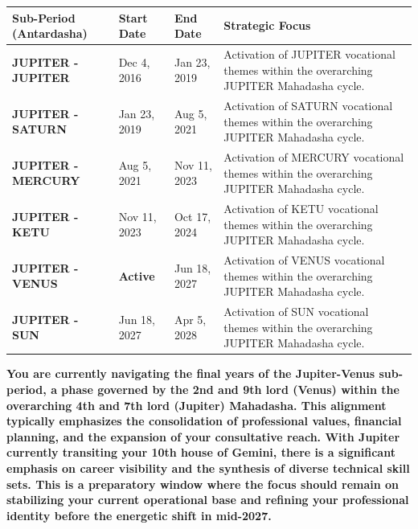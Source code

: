 \begin{executivecard}
  \sffamily\fontsize{8}{11.5}\selectfont
  \begin{tabularx}{\linewidth}{@{}l l l X@{}}
    \toprule
    \textbf{Sub-Period (Antardasha)} & \textbf{Start Date} & \textbf{End Date} & \textbf{Strategic Focus} \\
    \midrule
    \textbf{JUPITER - JUPITER} & Dec 4, 2016 & Jan 23, 2019 & Activation of JUPITER vocational themes within the overarching JUPITER Mahadasha cycle. \\
    \textbf{JUPITER - SATURN} & Jan 23, 2019 & Aug 5, 2021 & Activation of SATURN vocational themes within the overarching JUPITER Mahadasha cycle. \\
    \textbf{JUPITER - MERCURY} & Aug 5, 2021 & Nov 11, 2023 & Activation of MERCURY vocational themes within the overarching JUPITER Mahadasha cycle. \\
    \textbf{JUPITER - KETU} & Nov 11, 2023 & Oct 17, 2024 & Activation of KETU vocational themes within the overarching JUPITER Mahadasha cycle. \\
    \textbf{JUPITER - VENUS} & \textbf{Active} & Jun 18, 2027 & Activation of VENUS vocational themes within the overarching JUPITER Mahadasha cycle. \\
    \textbf{JUPITER - SUN} & Jun 18, 2027 & Apr 5, 2028 & Activation of SUN vocational themes within the overarching JUPITER Mahadasha cycle. \\
    \bottomrule
  \end{tabularx}
\end{executivecard}\vspace{2mm}

\label{topic56}

{\fontsize{9.5}{13.8}\selectfont\bfseries\color{DeepSlate} You are currently navigating the final years of the Jupiter-Venus sub-period, a phase governed by the 2nd and 9th lord (Venus) within the overarching 4th and 7th lord (Jupiter) Mahadasha. This alignment typically emphasizes the consolidation of professional values, financial planning, and the expansion of your consultative reach. With Jupiter currently transiting your 10th house of Gemini, there is a significant emphasis on career visibility and the synthesis of diverse technical skill sets. This is a preparatory window where the focus should remain on stabilizing your current operational base and refining your professional identity before the energetic shift in mid-2027.}\par\vspace{2mm}

